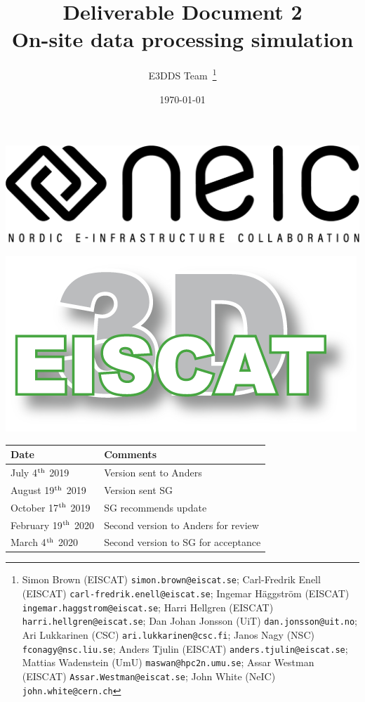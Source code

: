\documentclass[12pt,a4paper]{article}
\title{
{\bf Deliverable Document 2} \\
On-site data processing simulation}
\author{E3DDS Team~\footnote{
Simon Brown (EISCAT) {\tt simon.brown@eiscat.se};
Carl-Fredrik Enell (EISCAT) {\tt carl-fredrik.enell@eiscat.se};
Ingemar H\"{a}ggstr\"{o}m (EISCAT) {\tt ingemar.haggstrom@eiscat.se};
Harri Hellgren (EISCAT) {\tt harri.hellgren@eiscat.se};
Dan Johan Jonsson (UiT) {\tt dan.jonsson@uit.no};
Ari Lukkarinen (CSC) {\tt ari.lukkarinen@csc.fi};
Janos Nagy (NSC) {\tt fconagy@nsc.liu.se};
Anders Tjulin (EISCAT) {\tt anders.tjulin@eiscat.se};
Mattias Wadenstein (UmU) {\tt maswan@hpc2n.umu.se};
Assar Westman (EISCAT) {\tt Assar.Westman@eiscat.se};
John White (NeIC) {\tt john.white@cern.ch}}}
\date{\today}
\begin{document}
\pagestyle{fancy}

\maketitle
\par\noindent
\begin{minipage}{0.5\textwidth}
  \includegraphics[scale=0.18]{NEIC_logo_screen_black.pdf}
\end{minipage}
\begin{minipage}{0.5\textwidth}
  \hfill
  \includegraphics[width=0.75\linewidth]{e3d-logo-green-500px}
\end{minipage}

\begin{center}
\begin{tabular}{|l|l|} \hline
\large \bf Date & \large \bf Comments \\ \hline
\large July 4$^{\rm th}$ 2019 & Version sent to Anders \\ \hline
\large August 19$^{\rm th}$ 2019 & Version sent SG \\
\hline
\large October 17$^{\rm th}$ 2019 & SG recommends update\\
\hline
\large February 19$^{\rm th}$ 2020 & Second version to Anders for review \\
\hline
\large March 4$^{\rm th}$ 2020 & Second version to SG for acceptance \\
\hline
\end{tabular}
\end{center}
\end{document}
